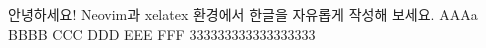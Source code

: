\documentclass{article}
\begin{document}
안녕하세요! Neovim과 xelatex 환경에서 한글을 자유롭게 작성해 보세요.
AAAa
BBBB
CCC
DDD
EEE
FFF
333333333333333333
\end{document}
